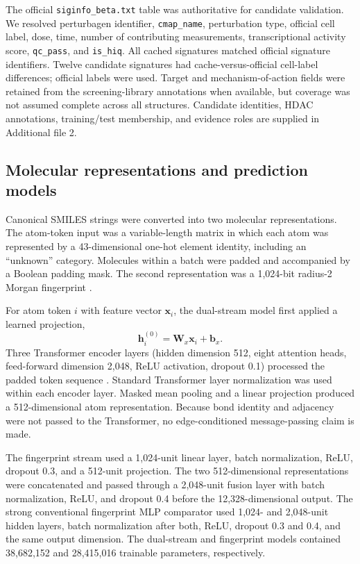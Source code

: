 

The official \texttt{siginfo\_beta.txt} table was authoritative for candidate validation. We resolved perturbagen identifier, \texttt{cmap\_name}, perturbation type, official cell label, dose, time, number of contributing measurements, transcriptional activity score, \texttt{qc\_pass}, and \texttt{is\_hiq}. All cached signatures matched official signature identifiers. Twelve candidate signatures had cache-versus-official cell-label differences; official labels were used. Target and mechanism-of-action fields were retained from the screening-library annotations when available, but coverage was not assumed complete across all structures. Candidate identities, HDAC annotations, training/test membership, and evidence roles are supplied in Additional file 2.

\subsection{Molecular representations and prediction models}

\begin{minorrevision}
Canonical SMILES strings were converted into two molecular representations. The atom-token input was a variable-length matrix in which each atom was represented by a 43-dimensional one-hot element identity, including an ``unknown'' category. Molecules within a batch were padded and accompanied by a Boolean padding mask. The second representation was a 1,024-bit radius-2 Morgan fingerprint \cite{landrum2013,rogers2010}.

For atom token $i$ with feature vector $\bm{x}_i$, the dual-stream model first applied a learned projection,
\begin{equation}
\bm{h}^{(0)}_i=\bm{W}_{x}\bm{x}_i+\bm{b}_{x}.
\end{equation}
Three Transformer encoder layers (hidden dimension 512, eight attention heads, feed-forward dimension 2,048, ReLU activation, dropout 0.1) processed the padded token sequence \cite{vaswani2017}. Standard Transformer layer normalization was used within each encoder layer. Masked mean pooling and a linear projection produced a 512-dimensional atom representation. Because bond identity and adjacency were not passed to the Transformer, no edge-conditioned message-passing claim is made.

\begin{roundtworevision}
The fingerprint stream used a 1,024-unit linear layer, batch normalization, ReLU, dropout 0.3, and a 512-unit projection. The two 512-dimensional representations were concatenated and passed through a 2,048-unit fusion layer with batch normalization, ReLU, and dropout 0.4 before the 12,328-dimensional output. The strong conventional fingerprint MLP comparator used 1,024- and 2,048-unit hidden layers, batch normalization after both, ReLU, dropout 0.3 and 0.4, and the same output dimension. The dual-stream and fingerprint models contained 38,682,152 and 28,415,016 trainable parameters, respectively.\par
\end{roundtworevision}
\end{minorrevision}

